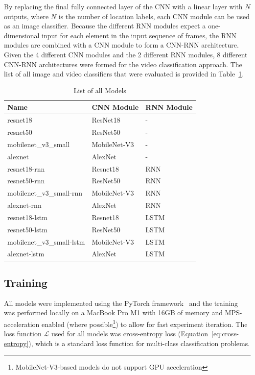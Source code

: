 \documentclass[a4paper]{article}
\begin{document}
  By replacing the final fully connected layer of the CNN with a linear layer
  with $N$ outputs, where $N$ is the number of location labels, each CNN module
  can be used as an image classifier. Because the different RNN modules expect a
  one-dimensional input for each element in the input sequence of frames, the
  RNN modules are combined with a CNN module to form a CNN-RNN architecture.
  Given the 4 different CNN modules and the 2 different RNN modules, 8 different
  CNN-RNN architectures were formed for the video classification approach. The
  list of all image and video classifiers that were evaluated is provided in
  Table~\ref{tab:models}.


  \begin{table}[ht]
    \centering
    \begin{tabular}{lll}
      \toprule
      \bfseries Name & \bfseries CNN Module & \bfseries RNN Module \\
      \midrule
      resnet18 & ResNet18 & - \\
      resnet50 & ResNet50 & - \\
      mobilenet\_v3\_small & MobileNet-V3 & - \\
      alexnet & AlexNet & - \\
      \midrule
      resnet18-rnn & Resnet18 & RNN \\
      resnet50-rnn & ResNet50 & RNN \\
      mobilenet\_v3\_small-rnn & MobileNet-V3 & RNN \\
      alexnet-rnn & AlexNet & RNN \\
      resnet18-lstm & Resnet18 & LSTM \\
      resnet50-lstm & ResNet50 & LSTM \\
      mobilenet\_v3\_small-lstm & MobileNet-V3 & LSTM \\
      alexnet-lstm & AlexNet & LSTM \\
      \bottomrule
    \end{tabular}
    \caption{List of all Models}
    \label{tab:models}
  \end{table}


  \subsection{Training} %
  \label{sub:training}

  All models were implemented using the PyTorch framework~\cite{pytorch} and the
  training was performed locally on a MacBook Pro M1 with 16GB of memory and
  MPS-acceleration enabled (where possible\footnote{MobileNet-V3-based models do
  not support GPU acceleration}) to allow for fast experiment iteration. The
  loss function $\mathcal{L}$ used for all models was cross-entropy loss
  (Equation~\ref{eq:cross-entropy}), which
  is a standard loss function for multi-class classification problems.
\end{document}
